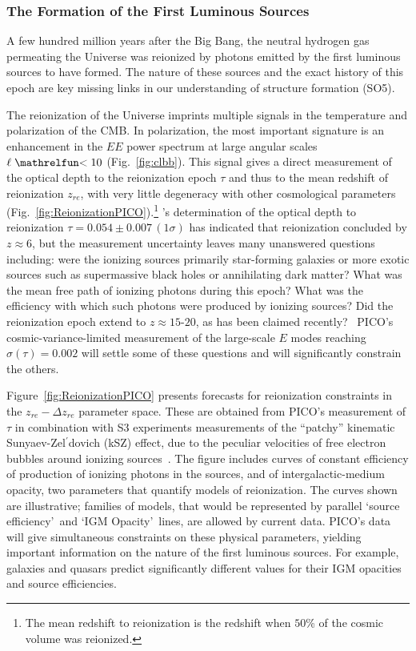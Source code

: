 \documentclass[PICOReport.tex]{subfiles}
\begin{document}
\subsubsection{The Formation of the First Luminous Sources} 
\label{luminoussources}  
A few hundred million years after the Big Bang, the neutral hydrogen gas permeating the Universe was reionized by photons emitted by the first luminous sources to have formed.  The nature of these sources and the exact history of this epoch are key missing links in our understanding of structure formation (SO5).  

The reionization of the Universe imprints multiple signals in the temperature and polarization of the CMB.  In polarization, the most important signature is an enhancement in the $EE$ power spectrum at large angular scales $\ell \simlt 10$ (Fig.~\ref{fig:clbb}). This signal gives a direct measurement of the optical depth to the reionization epoch $\tau$ and thus to the mean redshift of reionization $z_{re}$, with very little degeneracy with other cosmological parameters (Fig.~\ref{fig:ReionizationPICO}).\footnote{The mean redshift to reionization is the redshift when $50$\% of the cosmic volume was reionized.} \planck 's determination of the optical depth to reionization $\tau = 0.054 \pm 0.007\, (1\sigma) $ has indicated that reionization concluded by $z \approx 6$, but the measurement uncertainty leaves many unanswered questions including: were the ionizing sources primarily star-forming galaxies or more exotic sources such as supermassive black holes or annihilating dark matter? What was the mean free path of ionizing photons during this epoch?  What was the efficiency with which such photons were produced by ionizing sources?  
Did the reionization epoch extend to $z \approx 15$-$20$, as has been claimed recently?~\citep{Miranda2017} PICO's cosmic-variance-limited measurement of the large-scale $E$ modes reaching $\sigma(\tau)=0.002$ will settle some of these questions and will significantly constrain the others.

Figure~\ref{fig:ReionizationPICO} presents forecasts for reionization constraints in the $z_{re} - \Delta z_{re}$ parameter space. These are obtained from PICO's measurement of $\tau$ in combination with S3 experiments measurements of the ``patchy'' kinematic Sunyaev-Zel$^{\prime}$dovich (kSZ) effect, due to the peculiar velocities of free electron bubbles around ionizing sources~\citep{Calabrese2014}.
The figure includes curves of constant efficiency of production of ionizing photons in the sources, and of intergalactic-medium opacity, two parameters that quantify models of reionization. The curves shown are illustrative; families of models, that would be represented by parallel \lq source efficiency\rq~and \lq IGM Opacity\rq~lines, are allowed by current data. PICO's data will give simultaneous constraints on these physical parameters, yielding important information on the nature of the first luminous sources. For example, galaxies and quasars predict significantly different values for their IGM opacities and source efficiencies.  
\end{document}
